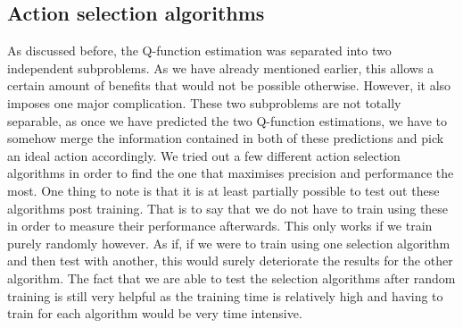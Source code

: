 \subsection{Action selection algorithms}
As discussed before, the Q-function estimation was separated into two independent subproblems. As we have already mentioned earlier, this allows a certain amount of benefits that would not be possible otherwise. However, it also imposes one major complication. These two subproblems are not totally separable, as once we have predicted the two Q-function estimations, we have to somehow merge the information contained in both of these predictions and pick an ideal action accordingly. We tried out a few different action selection algorithms in order to find the one that maximises precision and performance the most. One thing to note is that it is at least partially possible to test out these algorithms post training. That is to say that we do not have to train using these in order to measure their performance afterwards. This only works if we train purely randomly however. As if, if we were to train using one selection algorithm and then test with another, this would surely deteriorate the results for the other algorithm. The fact that we are able to test the selection algorithms after random training is still very helpful as the training time is relatively high and having to train for each algorithm would be very time intensive.
